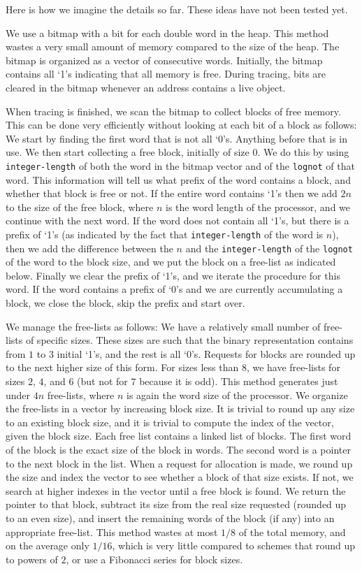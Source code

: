 \documentclass{article}
\begin{document}
Here is how we imagine the details so far.  These ideas have not been
tested yet. 

We use a bitmap with a bit for each double word in the heap.  This
method wastes a very small amount of memory compared to the size of
the heap.  The bitmap is organized as a vector of consecutive words.
Initially, the bitmap contains all `1's indicating that all memory is
free.  During tracing, bits are cleared in the bitmap
whenever an address contains a live object.

When tracing is finished, we scan the bitmap to collect blocks of free
memory.  This can be done very efficiently without looking at each bit
of a block as follows: We start by finding the first word that is not
all `0's.  Anything before that is in use.  We then start collecting a
free block, initially of size 0. We do this by using
\texttt{integer-length} of both the word in the bitmap vector and of
the \texttt{lognot} of that word.  This information will tell us what
prefix of the word contains a block, and whether that block is free or
not.  If the entire word contains `1's then we add $2n$ to the size of
the free block, where $n$ is the word length of the processor, and we
continue with the next word.  If the word does not contain all `1's,
but there is a prefix of `1's (as indicated by the fact that
\texttt{integer-length} of the word is $n$), then we add the
difference between the $n$ and the \texttt{integer-length} of the
\texttt{lognot} of the word to the block size, and we put the block on
a free-list as indicated below.  Finally we clear the prefix of `1's,
and we iterate the procedure for this word.  If the word contains a
prefix of `0's and we are currently accumulating a block, we close the
block, skip the prefix and start over.  

We manage the free-lists as follows:  We have a relatively small
number of free-lists of specific sizes.  These sizes are such that the
binary representation contains from $1$ to $3$ initial `1's, and the
rest is all `0's.  Requests for blocks are rounded up to the next
higher size of this form.  For sizes less than $8$, we have free-lists
for sizes $2$, $4$, and $6$ (but not for $7$ because it is odd).  This
method generates just under $4n$ free-lists, where $n$ is again the
word size of the processor.  We organize the free-lists in a vector
by increasing block size.  It is trivial to round up any size to an
existing block size, and it is trivial to compute the index of the
vector, given the block size.  Each free list contains a linked list
of blocks.  The first word of the block is the exact size of the block
in words.  The second word is a pointer to the next block in the
list.  When a request for allocation is made, we round up the size and
index the vector to see whether a block of that size exists.  If not,
we search at higher indexes in the vector until a free block is
found.  We return the pointer to that block, subtract its size from
the real size requested (rounded up to an even size), and insert the
remaining words of the block (if any) into an appropriate free-list.  
This method wastes at most $1/8$ of the total memory, and on the
average only $1/16$, which is very little compared to schemes that
round up to powers of $2$, or use a Fibonacci series for block sizes. 
\end{document}
